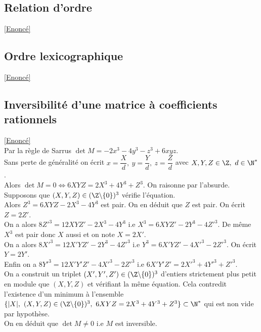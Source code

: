 \documentclass[8pt]{book}
\begin{document}
\subsection{Relation d'ordre}
\label{Relation d'ordre corrigé}
\textcolor{blue}{\hyperref[Relation d'ordre]{[Enoncé]}}\\

\subsection{Ordre lexicographique}
\label{Ordre lexicographique corrigé}
\textcolor{blue}{\hyperref[Ordre lexicographique]{[Enoncé]}}\\

\subsection{Inversibilité d'une matrice à coefficients rationnels }
\label{Inversibilité d'une matrice à coefficients rationnels corrigé}
\textcolor{blue}{\hyperref[Inversibilité d'une matrice à coefficients rationnels]{[Enoncé]}}\\
Par la règle de Sarrus $\det M=-2x^3-4y^3-z^3+6xyz$.\\
Sans perte de généralité on écrit $x=\dfrac{X}{d},\ y=\dfrac{Y}{d},\ z=\dfrac{Z}{d}$ avec $X,Y,Z\in \Z,\ d\in \N^*$.\\
Alors $\det M=0\iff 6XYZ=2X^3+4Y^3+Z^3$. On raisonne par l'absurde. Supposons que $(X,Y,Z)\in (\Z\backslash\{0\})^3$ vérifie l'équation.\\
Alors $Z^3=6XYZ-2X^3-4Y^3$ est pair. On en déduit que $Z$ est pair. On écrit $Z=2Z'$.\\
On a alors $8Z'^3=12XYZ'-2X^3-4Y^3$ i.e $X^3=6XYZ'-2Y^3-4Z'^3$. De même $X^3$ est pair donc $X$ aussi et on note $X=2X'$.\\
On a alors $8X'^3=12X'YZ'-2Y^3-4Z'^3$ i.e $Y^3=6X'YZ'-4X'^3-2Z'^3$. On écrit $Y=2Y'$.\\
Enfin on a $8Y'^3=12X'Y'Z'-4X'^3-2Z'^3$ i.e $6X'Y'Z'=2X'^3+4Y'^3+Z'^3$.\\
On a construit un triplet $(X',Y',Z')\in (\Z\backslash\{0\})^3$ d'entiers strictement plus petit en module que $(X,Y,Z)$ et vérifiant la même équation. Cela contredit l'existence d'un minimum à l'ensemble $\{|X|,\ (X,Y,Z)\in (\Z\backslash\{0\})^3,\ 6XYZ=2X^3+4Y^3+Z^3\}\subset \N^*$ qui est non vide par hypothèse.\\
On en déduit que $\det M\ne 0$ i.e $M$ est inversible.
\end{document}
